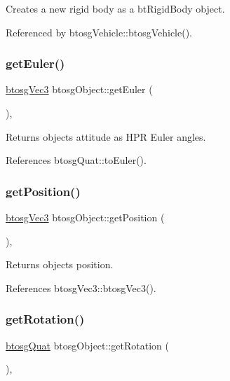 Creates a new rigid body as a bt\+Rigid\+Body object. 

Referenced by btosg\+Vehicle\+::btosg\+Vehicle().

\mbox{\label{classbtosgObject_a2019ec63bde02b72600450c7c985e77a}} 
\subsubsection{\texorpdfstring{get\+Euler()}{getEuler()}}
{\footnotesize\ttfamily \hyperlink{classbtosgVec3}{btosg\+Vec3} btosg\+Object\+::get\+Euler (\begin{DoxyParamCaption}{ }\end{DoxyParamCaption})\hspace{0.3cm}{\ttfamily [inline]}, {\ttfamily [inherited]}}

Returns object\textquotesingle{}s attitude as H\+PR Euler angles. 

References btosg\+Quat\+::to\+Euler().

\mbox{\label{classbtosgObject_a3dadd5da8f2a312e44a039446b93d4cd}} 
\subsubsection{\texorpdfstring{get\+Position()}{getPosition()}}
{\footnotesize\ttfamily \hyperlink{classbtosgVec3}{btosg\+Vec3} btosg\+Object\+::get\+Position (\begin{DoxyParamCaption}{ }\end{DoxyParamCaption})\hspace{0.3cm}{\ttfamily [inline]}, {\ttfamily [inherited]}}

Returns object\textquotesingle{}s position. 

References btosg\+Vec3\+::btosg\+Vec3().

\mbox{\label{classbtosgObject_a3b825999ad3a51bde743d4085ff19dae}} 
\subsubsection{\texorpdfstring{get\+Rotation()}{getRotation()}}
{\footnotesize\ttfamily \hyperlink{classbtosgQuat}{btosg\+Quat} btosg\+Object\+::get\+Rotation (\begin{DoxyParamCaption}{ }\end{DoxyParamCaption})\hspace{0.3cm}{\ttfamily [inline]}, {\ttfamily [inherited]}}

